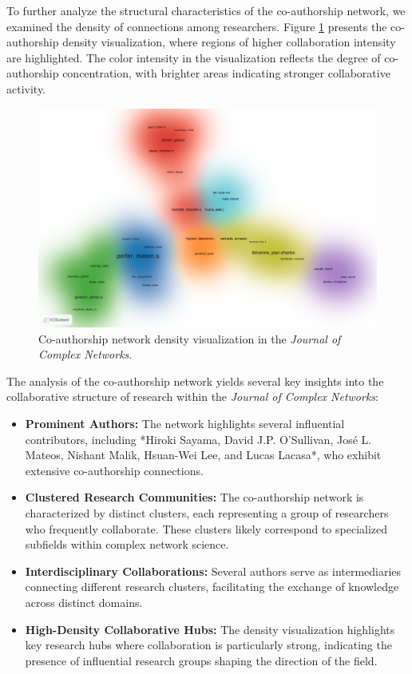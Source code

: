 \documentclass[twocolumn]{article}
\begin{document}
		To further analyze the structural characteristics of the co-authorship network, we examined the density of connections among researchers. Figure \ref{fig.fig17} presents the co-authorship density visualization, where regions of higher collaboration intensity are highlighted. The color intensity in the visualization reflects the degree of co-authorship concentration, with brighter areas indicating stronger collaborative activity.
		
		\begin{figure}[htbp]
			\centering
			\includegraphics[width=\columnwidth]{Journal of Complex Networks/VOS/co-authorship-density.pdf}
			\caption{Co-authorship network density visualization in the \textit{Journal of Complex Networks}.}
			\label{fig.fig17}
		\end{figure}
		
		The analysis of the co-authorship network yields several key insights into the collaborative structure of research within the \textit{Journal of Complex Networks}:
		
		\begin{itemize}
			\item \textbf{Prominent Authors:} The network highlights several influential contributors, including *Hiroki Sayama, David J.P. O’Sullivan, José L. Mateos, Nishant Malik, Hsuan-Wei Lee, and Lucas Lacasa*, who exhibit extensive co-authorship connections.
			\item \textbf{Clustered Research Communities:} The co-authorship network is characterized by distinct clusters, each representing a group of researchers who frequently collaborate. These clusters likely correspond to specialized subfields within complex network science.
			\item \textbf{Interdisciplinary Collaborations:} Several authors serve as intermediaries connecting different research clusters, facilitating the exchange of knowledge across distinct domains.
			\item \textbf{High-Density Collaborative Hubs:} The density visualization highlights key research hubs where collaboration is particularly strong, indicating the presence of influential research groups shaping the direction of the field.
		\end{itemize}
		
\end{document}
